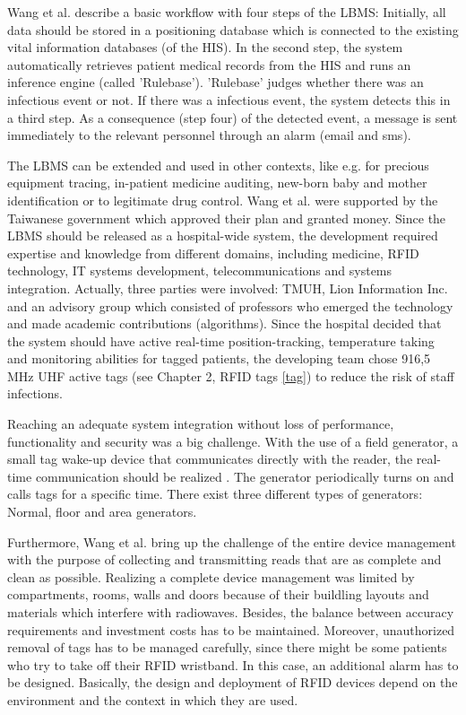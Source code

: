 Wang et al. describe a basic workflow with four steps of the LBMS: Initially, all data should be stored in a positioning database which is connected to the existing vital information databases (of the HIS). In the second step, the system automatically retrieves patient medical records from the HIS and runs an inference engine (called 'Rulebase').  'Rulebase' judges whether there was an infectious event or not. If there was a infectious event, the system detects this in a third step. As a consequence (step four) of the detected event, a message is sent immediately to the relevant personnel through an alarm (email and sms). 

The LBMS can be extended and used in other contexts, like e.g. for precious equipment tracing, in-patient medicine auditing, new-born baby and mother identification or to legitimate drug control.
Wang et al. were supported by the Taiwanese government which approved their plan and granted money. Since the LBMS should be released as a hospital-wide system, the development required expertise and knowledge from different domains, including medicine, RFID technology, IT systems development, telecommunications and systems integration. Actually, three parties were involved: TMUH, Lion Information Inc. and an advisory group \cite[p.4]{casestudy} which consisted of professors who emerged the technology and made academic contributions (algorithms).
Since the hospital decided that the system should have active real-time position-tracking, temperature taking and monitoring abilities for tagged patients, the developing team chose 916,5 MHz UHF active tags (see Chapter 2, RFID tags \ref{tag}) to reduce the risk of staff infections.

Reaching an adequate system integration without loss of performance, functionality and security was a big challenge. With the use of a field generator, a small tag wake-up device that communicates directly with the reader, the real-time communication should be realized \cite[p.4]{casestudy}. The generator periodically turns on and calls tags for a specific time. There exist three different types of generators: Normal, floor and area generators.

Furthermore, Wang et al. bring up the challenge of the entire device management \cite[p.5]{casestudy} with the purpose of collecting and transmitting reads that are as complete and clean as possible. Realizing a complete device management was limited by compartments, rooms, walls and doors because of their buildling layouts and materials which interfere with radiowaves. Besides, the balance between accuracy requirements and investment costs has to be maintained. Moreover, unauthorized removal of tags has to be managed carefully, since there might be some patients who try to take off their RFID wristband. In this case, an additional alarm has to be designed. Basically, the design and deployment of RFID devices depend on the environment and the context in which they are used. 

